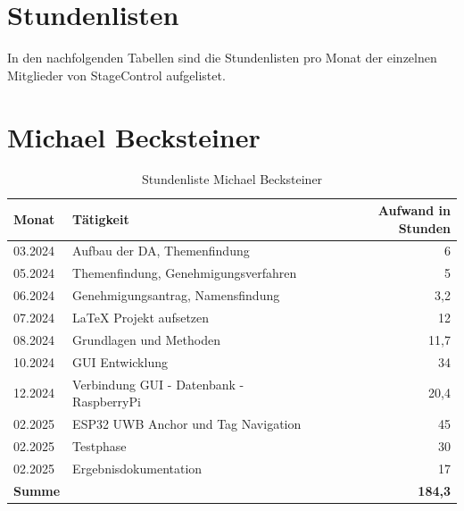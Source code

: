 \section*{Stundenlisten}
In den nachfolgenden Tabellen sind die Stundenlisten pro Monat der einzelnen Mitglieder von StageControl aufgelistet.

\section*{Michael Becksteiner}

\begin{table}[h]
	\begin{tabular}{p{2.5cm} p{10.5cm} r}
		\hline
		\textbf{Monat} & \textbf{Tätigkeit} & \textbf{Aufwand in Stunden} \\
		\hline
		03.2024 & Aufbau der DA, Themenfindung & 6 \\
		05.2024 & Themenfindung, Genehmigungsverfahren & 5 \\
		06.2024 & Genehmigungsantrag, Namensfindung & 3,2 \\
		07.2024 & LaTeX Projekt aufsetzen & 12 \\
		08.2024 & Grundlagen und Methoden & 11,7 \\
		10.2024 & GUI Entwicklung & 34 \\
		12.2024 & Verbindung GUI - Datenbank - RaspberryPi & 20,4 \\
		02.2025 & ESP32 UWB Anchor und Tag Navigation & 45 \\
		02.2025 & Testphase & 30 \\
		02.2025 & Ergebnisdokumentation & 17 \\
		\hline
		\textbf{Summe} & & \textbf{184,3} \\
		\hline
	\end{tabular}
	\caption{Stundenliste Michael Becksteiner}
	\label{tab:arbeitsaufwand_Becksteiner}
\end{table}
\newpage

